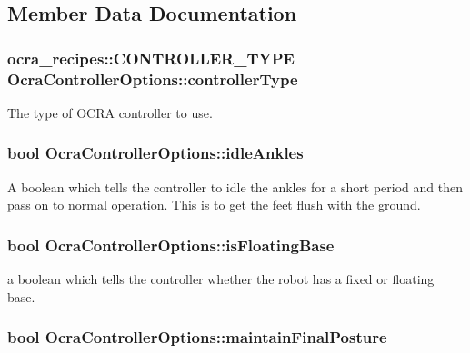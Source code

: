 \subsection{\-Member \-Data \-Documentation}
\hypertarget{classOcraControllerOptions_aa533fe11c53b7fb17105f1edf48e1c0d}{
\subsubsection[{controller\-Type}]{\setlength{\rightskip}{0pt plus 5cm}ocra\-\_\-recipes\-::\-C\-O\-N\-T\-R\-O\-L\-L\-E\-R\-\_\-\-T\-Y\-P\-E {\bf \-Ocra\-Controller\-Options\-::controller\-Type}}}\label{classOcraControllerOptions_aa533fe11c53b7fb17105f1edf48e1c0d}
\-The type of \-O\-C\-R\-A controller to use. \hypertarget{classOcraControllerOptions_a34c0a162302f4f2c462d9ce4818292d5}{
\subsubsection[{idle\-Ankles}]{\setlength{\rightskip}{0pt plus 5cm}bool {\bf \-Ocra\-Controller\-Options\-::idle\-Ankles}}}\label{classOcraControllerOptions_a34c0a162302f4f2c462d9ce4818292d5}
\-A boolean which tells the controller to idle the ankles for a short period and then pass on to normal operation. \-This is to get the feet flush with the ground. \hypertarget{classOcraControllerOptions_a1edf322553d88c1ac2bf8947e9d942d7}{
\subsubsection[{is\-Floating\-Base}]{\setlength{\rightskip}{0pt plus 5cm}bool {\bf \-Ocra\-Controller\-Options\-::is\-Floating\-Base}}}\label{classOcraControllerOptions_a1edf322553d88c1ac2bf8947e9d942d7}
a boolean which tells the controller whether the robot has a fixed or floating base. \hypertarget{classOcraControllerOptions_ae7b16a5b8264abd18ee8761eb1091ccf}{
\subsubsection[{maintain\-Final\-Posture}]{\setlength{\rightskip}{0pt plus 5cm}bool {\bf \-Ocra\-Controller\-Options\-::maintain\-Final\-Posture}}}\label{classOcraControllerOptions_ae7b16a5b8264abd18ee8761eb1091ccf}
